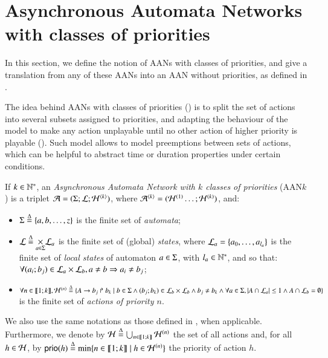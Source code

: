 \section{Asynchronous Automata Networks with classes of priorities}
\label{sec:flattening}

In this section, we define the notion of AANs with classes of priorities,
and give a translation from any of these AANs into
an AAN without priorities, as defined in .

The idea behind AANs with classes of priorities ()
is to split the set of actions into several subsets assigned to priorities,
and adapting the behaviour of the model to make any action unplayable
until no other action of higher priority is playable ().
Such model allows to model preemptions between sets of actions,
which can be helpful to abstract time or duration properties under certain conditions.

\begin{definition}
\label{def:php}
  If $k \in \mathbb{N}^*$,
  an \emph{Asynchronous Automata Network with $k$ classes of priorities} (AAN$k$)
  is a triplet $\mathcal{A} = (\Sigma; \mathcal{L}; \mathcal{H}^{{\langle k \rangle}})$,
  where $\mathcal{A}^{{\langle k \rangle}} = (\mathcal{H}^{(1)} \dots; \mathcal{H}^{(k)})$,
  and:
  \begin{itemize}
    \item $\Sigma \stackrel{\Delta}= \{a, b, \dots, z\}$ is the finite set of \emph{automata};
    \item $\mathcal{L} \stackrel{\Delta}= \underset{a \in \Sigma}{\times} \mathcal{L}_a$ is the finite set of
      (global) \emph{states},
      where $\mathcal{L}_a = \{a_0, \ldots, a_{l_a}\}$ is the finite set of \emph{local states}
      of automaton $a \in \Sigma$, with $l_a \in \mathbb{N}^*$,
      and so that:
      $\forall (a_i; b_j) \in \mathcal{L}_a \times \mathcal{L}_b, a \neq b \Rightarrow a_i \neq b_j$;
    \item $\forall n \in \llbracket 1; k \rrbracket,
      \mathcal{H}^{(n)} \stackrel{\Delta}= \{A\rightarrow b_j\Rsh b_k \mid
      b \in \Sigma \wedge (b_j; b_k) \in \mathcal{L}_b \times \mathcal{L}_b \wedge
      b_j \neq b_k \wedge
      \forall a \in \Sigma, |A \cap \mathcal{L}_a| \leq 1 \wedge
      A \cap \mathcal{L}_b = \emptyset \}$ is the finite set of \emph{actions of priority $n$}.
  \end{itemize}
  We also use the same notations as those defined in , when applicable.
  Furthermore,
  we denote by $\mathcal{H} \stackrel{\Delta}= \bigcup_{n \in \llbracket 1; k \rrbracket} \mathcal{H}^{(n)}$ the set of all actions
  and, for all $h \in \mathcal{H}$,
  by $\mathsf{prio}(h) \stackrel{\Delta}= \min\{ n \in \llbracket 1; k \rrbracket \mid h \in \mathcal{H}^{(n)} \}$
  the priority of action $h$.
\end{definition}

